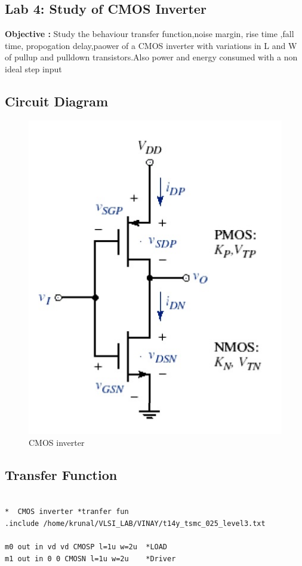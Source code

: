 \documentclass[12pt,a4paper]{article}
\begin{document}
\begin{center}
\section{Lab 4: Study of CMOS Inverter}
{\bf{Objective :}}
Study the behaviour transfer function,noise margin, rise time ,fall time, propogation delay,paower of a CMOS inverter with variations in L and W of pullup and pulldown transistors.Also power and energy consumed with a non ideal step input
\subsection{Circuit Diagram}
\begin{figure}[!ht]
\centering
\includegraphics[scale=0.37]{cmos_inverter.jpg}
 \caption[Short]{CMOS inverter}
 \end{figure}
 
\subsection{Transfer Function}
\begin{lstlisting}

*  CMOS inverter *tranfer fun 
.include /home/krunal/VLSI_LAB/VINAY/t14y_tsmc_025_level3.txt

m0 out in vd vd CMOSP l=1u w=2u  *LOAD 
m1 out in 0 0 CMOSN l=1u w=2u	 *Driver


\end{lstlisting}
\end{center}
\end{document}
